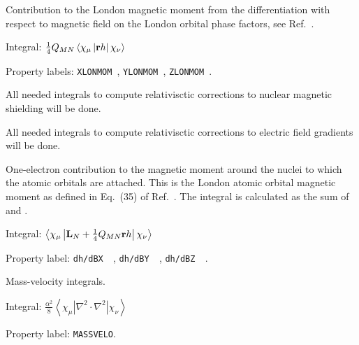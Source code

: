 \begin{description}
\begin{list}{}{}
\end{list}

\item[\Key{LONMOM}] Contribution to the London magnetic
moment from
the differentiation with respect to magnetic field on the London
orbital phase factors, see Ref.~\cite{thpjjcp95}.

\begin{list}{}{}
\item Integral:
$\frac{1}{4}Q_{MN}\left<\chi_{\mu}\left|{\bf r}h\right|\chi_{\nu}\right>$
\item Property labels: \verb|XLONMOM |, \verb|YLONMOM |, \verb|ZLONMOM |.
\end{list}


\item[\Key{LR-SHI}] All needed integrals to compute relativisctic corrections 
to nuclear magnetic shielding will be done. 
\item[\Key{LR-EFG}] All needed integrals to compute relativisctic corrections 
to electric field gradients will be done.


\item[\Key{MAGMOM}] One-electron contribution to the magnetic
moment
around the nuclei to which the
atomic orbitals are attached. This is the London atomic
orbital
magnetic moment as defined in Eq.~(35) of
Ref.~\cite{krthklbpjhjajjcp99}. The integral is calculated as the sum of  and .

\begin{list}{}{}
\item Integral:
$\left<\chi_{\mu}\left|{\bf L}_N + \frac{1}{4}Q_{MN}{\bf
r}h\right|\chi_{\nu}\right>$
\item Property label: \verb|dh/dBX  |, \verb|dh/dBY  |, \verb|dh/dBZ  |.
\end{list}

\item[\Key{MASSVE}] Mass-velocity integrals.

\begin{list}{}{}
\item Integral:
$\frac{\alpha^2}{8}\left<\chi_{\mu}\left|\nabla^{2}\cdot\nabla^2\right|\chi_{\nu}\right>$
\item Property label: \verb|MASSVELO|.
\end{list}


\end{description}

